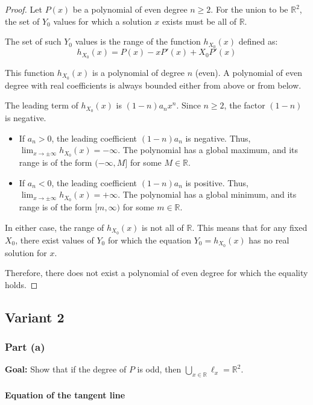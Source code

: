 \documentclass[12pt,a4paper]{article}
\theoremstyle{definition}
\begin{document}
\begin{proof}
Let $P(x)$ be a polynomial of even degree $n \geq 2$. For the union to be $\mathbb{R}^2$, the set of $Y_0$ values for which a solution $x$ exists must be all of $\mathbb{R}$.

The set of such $Y_0$ values is the range of the function $h_{X_0}(x)$ defined as:
\[h_{X_0}(x) = P(x) - xP'(x) + X_0 P'(x)\]

This function $h_{X_0}(x)$ is a polynomial of degree $n$ (even). A polynomial of even degree with real coefficients is always bounded either from above or from below.

The leading term of $h_{X_0}(x)$ is $(1-n)a_n x^n$. Since $n \geq 2$, the factor $(1-n)$ is negative.

\begin{itemize}
\item If $a_n > 0$, the leading coefficient $(1-n)a_n$ is negative. Thus, $\lim_{x \to \pm\infty} h_{X_0}(x) = -\infty$. The polynomial has a global maximum, and its range is of the form $(-\infty, M]$ for some $M \in \mathbb{R}$.

\item If $a_n < 0$, the leading coefficient $(1-n)a_n$ is positive. Thus, $\lim_{x \to \pm\infty} h_{X_0}(x) = +\infty$. The polynomial has a global minimum, and its range is of the form $[m, \infty)$ for some $m \in \mathbb{R}$.
\end{itemize}

In either case, the range of $h_{X_0}(x)$ is not all of $\mathbb{R}$. This means that for any fixed $X_0$, there exist values of $Y_0$ for which the equation $Y_0 = h_{X_0}(x)$ has no real solution for $x$.

Therefore, there does not exist a polynomial of even degree for which the equality holds.
\end{proof}

\subsection{Variant 2}

\subsubsection*{Part (a)}

\textbf{Goal:} Show that if the degree of $P$ is odd, then $\bigcup_{x\in\mathbb{R}}\ell_x = \mathbb{R}^2$.

\paragraph{Equation of the tangent line}
\end{document}
